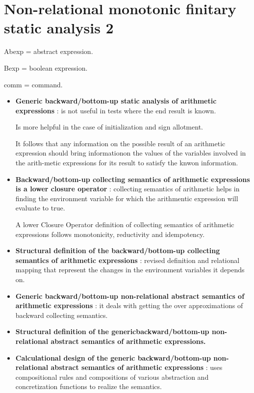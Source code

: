 \chapter{Non-relational monotonic finitary static analysis 2}

Abexp = abstract expression.

Bexp = boolean expression.

comm = command.


\begin{itemize}
	\item{\textbf{Generic backward/bottom-up static analysis of arithmetic expressions} : is not useful in tests where the end result is known.

	Is more helpful in the case of initialization and sign allotment.

	It follows that any information on the possible result of an arithmetic expression should bring informationon the values of the variables involved in the arith-metic expressions for its result to satisfy the knwon information.
	}

	\item{\textbf{Backward/bottom-up collecting semantics of arithmetic expressions is a lower closure operator} : collecting semantics of arithmetic helps in finding the environment variable for which the arithmentic expression will evaluate to true.

	A lower Closure Operator definition of collecting semantics of arithmetic expressions follows monotonicity, reductivity and idempotency.
	}

	\item{\textbf{Structural definition of the backward/bottom-up collecting semantics of arithmetic expressions} : revised definition and relational mapping that represent the changes in the environment variables it depends on.
	}

	\item{\textbf{Generic backward/bottom-up non-relational abstract semantics of arithmetic expressions} : it deals with getting the over approximations of backward collecting semantics.
	}

	\item{\textbf{Structural definition of the genericbackward/bottom-up non-relational abstract semantics of arithmetic expressions.}
	}

	\item{\textbf{Calculational design of the generic backward/bottom-up non-relational abstract semantics of arithmetic expressions} : uses compositional rules and compositions of various abstraction and concretization functions to realize the semantics. 
	}


\end{itemize}
